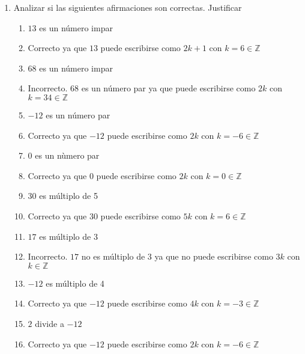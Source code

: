 \documentclass[a4paper]{article}
\newcommand{\answer}{\item[**]}
\newcommand{\exercise}{\item}
\begin{document}
\begin{enumerate}
\begin{multicols}{2}
\begin{enumerate} [label=(\alph*)]
		\item $13$ es un número impar
		\answer Correcto ya que $13$ puede escribirse como $2k+1$ con $k=6 \in \mathbb{Z}$

		\item $68$ es un número impar
		\answer Incorrecto. $68$ es un número par ya que puede escribirse como $2k$ con $k=34 \in \mathbb{Z}$

		\item $-12$ es un número par
		\answer Correcto ya que $-12$ puede escribirse como $2k$ con $k=-6 \in \mathbb{Z}$

		\item $0$ es un nùmero par
		\answer Correcto ya que $0$ puede escribirse como $2k$ con $k=0 \in \mathbb{Z}$

	\end{enumerate}
	\end{multicols}

	\exercise Analizar si las siguientes afirmaciones son correctas. Justificar
	\begin{multicols}{2}
	\begin{enumerate} [label=(\alph*)]
		\item $13$ es un número impar
		\answer Correcto ya que $13$ puede escribirse como $2k+1$ con $k=6 \in \mathbb{Z}$

		\item $68$ es un número impar
		\answer Incorrecto. $68$ es un número par ya que puede escribirse como $2k$ con $k=34 \in \mathbb{Z}$

		\item $-12$ es un número par
		\answer Correcto ya que $-12$ puede escribirse como $2k$ con $k=-6 \in \mathbb{Z}$

		\item $0$ es un nùmero par
		\answer Correcto ya que $0$ puede escribirse como $2k$ con $k=0 \in \mathbb{Z}$

		\item $30$ es múltiplo de 5
		\answer Correcto ya que $30$ puede escribirse como $5k$ con $k=6 \in \mathbb{Z}$

		\item $17$ es múltiplo de 3
		\answer Incorrecto. $17$ no es múltiplo de 3 ya que no puede escribirse como $3k$ con $k \in \mathbb{Z}$

		\item $-12$ es múltiplo de 4
		\answer Correcto ya que $-12$ puede escribirse como $4k$ con $k=-3 \in \mathbb{Z}$

		\item $2$ divide a $-12$
		\answer Correcto ya que $-12$ puede escribirse como $2k$ con $k=-6 \in \mathbb{Z}$


\end{enumerate}
\end{multicols}
\end{enumerate}
\end{document}
